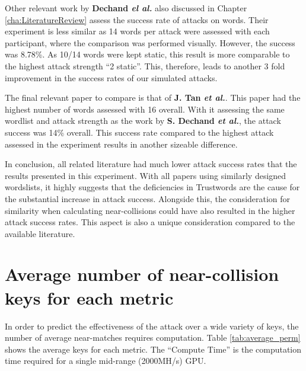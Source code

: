 Other relevant work by \textbf{Dechand \textit{el al.}}\cite{dechand2016empirical} also discussed in Chapter \ref{cha:LiteratureReview} assess the success rate of attacks on words. Their experiment is less similar as 14 words per attack were assessed with each participant, where the comparison was performed visually. However, the success was 8.78\%. As 10/14 words were kept static, this result is more comparable to the highest attack strength ``2 static''. This, therefore, leads to another 3 fold improvement in the success rates of our simulated attacks. 

The final relevant paper to compare is that of \textbf{J. Tan \textit{et al.}}\cite{tan2017can}. This paper had the highest number of words assessed with 16 overall. With it assessing the same wordlist and attack strength as the work by \textbf{S. Dechand \textit{et al.}}\cite{dechand2016empirical}, the attack success was 14\% overall. This success rate compared to the highest attack assessed in the experiment results in another sizeable difference.

In conclusion, all related literature had much lower attack success rates that the results presented in this experiment. With all papers using similarly designed wordslists, it highly suggests that the deficiencies in Trustwords are the cause for the substantial increase in attack success. Alongside this, the consideration for similarity when calculating near-collisions could have also resulted in the higher attack success rates. This aspect is also a unique consideration compared to the available literature.


\section{Average number of near-collision keys for each metric}
\label{sec:averagePerms}
In order to predict the effectiveness of the attack over a wide variety of keys, the number of average near-matches requires computation. Table \ref{tab:average_perm} shows the average keys for each metric. The ``Compute Time'' is the computation time required for a single mid-range (2000MH/s) GPU.

